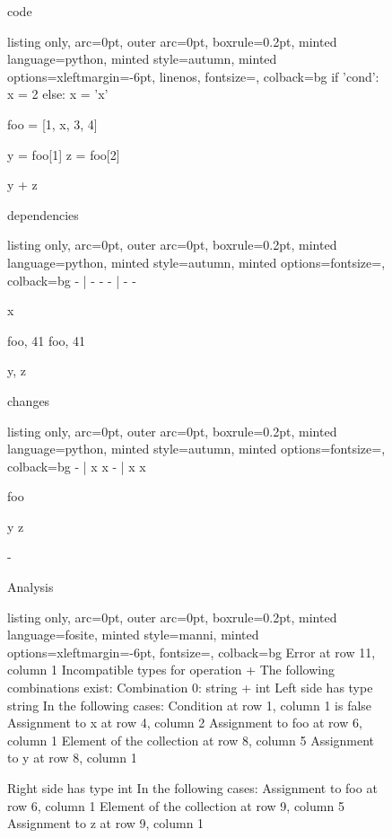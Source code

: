 \begin{figure}[t]
\vspace{-10pt}
 \begin{minipage}{0.32\textwidth}
 code
 \vspace{2pt}
  \begin{tcblisting}{listing only, 
    arc=0pt,
    outer arc=0pt, 
    boxrule=0.2pt,
    minted language=python,
    minted style=autumn,
    minted options={xleftmargin=-6pt, linenos, fontsize=\small},
    colback=bg }
if 'cond':
  x = 2
else:
  x = 'x'

foo = [1, x, 3, 4]

y = foo[1]
z = foo[2]

y + z
\end{tcblisting}
 \end{minipage}
 \begin{minipage}{0.32\textwidth}
 dependencies
  \begin{tcblisting}{listing only, 
    arc=0pt,
    outer arc=0pt, 
    boxrule=0.2pt,
    minted language=python,
    minted style=autumn,
    minted options={fontsize=\small},
    colback=bg }
- | -
    - 
- | -
    -

x

foo, 41
foo, 41

y, z
\end{tcblisting}
 \end{minipage}
 \begin{minipage}{0.32\textwidth}
 changes
  \begin{tcblisting}{listing only, 
    arc=0pt,
    outer arc=0pt, 
    boxrule=0.2pt,
    minted language=python,
    minted style=autumn,
    minted options={fontsize=\small},
    colback=bg }
- | x
    x
- | x
    x

foo

y
z

-
\end{tcblisting}
 \end{minipage}
 \begin{minipage}{\textwidth}
  \vspace{4pt}
  Analysis
  \begin{tcblisting}{listing only, 
    arc=0pt,
    outer arc=0pt, 
    boxrule=0.2pt,
    minted language=fosite,
    minted style=manni,
    minted options={xleftmargin=-6pt, fontsize=\small},
    colback=bg }
Error at row 11, column 1
  Incompatible types for operation +
  The following combinations exist:
  Combination 0: string + int
    Left side has type string
    In the following cases:
      Condition at row 1, column 1 is false
      Assignment to x at row 4, column 2
      Assignment to foo at row 6, column 1
      Element of the collection at row 8, column 5
      Assignment to y at row 8, column 1

    Right side has type int
    In the following cases:
      Assignment to foo at row 6, column 1
      Element of the collection at row 9, column 5
      Assignment to z at row 9, column 1
\end{tcblisting}
 \end{minipage}
 \label{lst:indexing}
 \vspace{-10pt}
\end{figure}